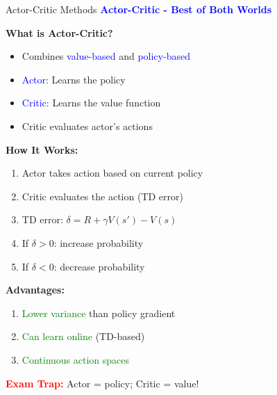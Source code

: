\documentclass[8pt]{beamer}
\begin{document}
	\begin{frame}{Actor-Critic Methods}
		\fontsize{6.5}{7.5}\selectfont
		\textcolor{blue}{\textbf{Actor-Critic - Best of Both Worlds}}
		
		\textbf{What is Actor-Critic?}
		\begin{itemize}
			\item Combines \textcolor{blue}{value-based} and \textcolor{blue}{policy-based}
			\item \textcolor{blue}{Actor}: Learns the policy
			\item \textcolor{blue}{Critic}: Learns the value function
			\item Critic evaluates actor's actions
		\end{itemize}
		
		\textbf{How It Works:}
		\begin{enumerate}
			\item Actor takes action based on current policy
			\item Critic evaluates the action (TD error)
			\item TD error: $\delta = R + \gamma V(s') - V(s)$
			\item If $\delta > 0$: increase probability
			\item If $\delta < 0$: decrease probability
		\end{enumerate}
		
		\textbf{Advantages:}
		\begin{enumerate}
			\item \textcolor{green}{Lower variance} than policy gradient
			\item \textcolor{green}{Can learn online} (TD-based)
			\item \textcolor{green}{Continuous action spaces}
		\end{enumerate}
		
		\textcolor{red}{\textbf{Exam Trap:}} Actor = policy; Critic = value!
	\end{frame}
	
	
\end{document}
